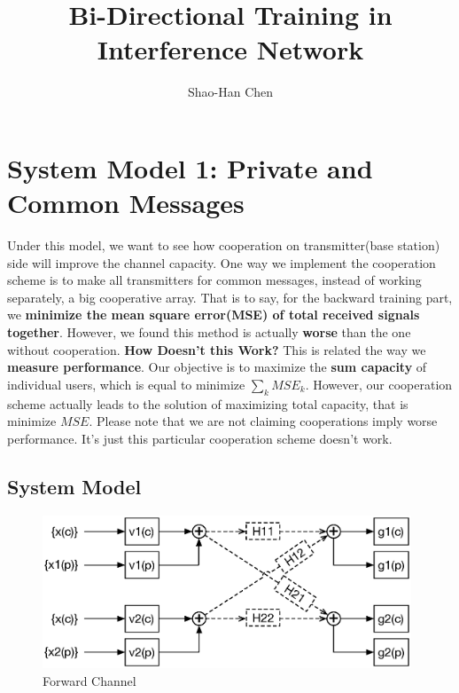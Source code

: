 \documentclass[11pt, oneside]{article}   	%
\begin{document}
\title{Bi-Directional Training in Interference Network}

\author{Shao-Han Chen}


\maketitle



\section{System Model 1: Private and Common Messages}

Under this model, we want to see how cooperation on transmitter(base station) side will improve the channel capacity. One way we implement the cooperation scheme is to make all transmitters for common messages, instead of working separately, a big cooperative array. That is to say, for the backward training part, we \textbf{minimize the mean square error(MSE) of total received signals together}. However, we found this method is actually \textbf{worse} than the one without cooperation. \textbf{How Doesn't this Work?} This is related the way we \textbf{measure performance}. Our objective is to maximize the \textbf{sum capacity} of individual users, which is equal to minimize $\displaystyle\sum_{k} MSE_{k}$. However, our cooperation scheme actually leads to the solution of maximizing total capacity, that is minimize $MSE$. Please note that we are not claiming cooperations imply worse performance. It's just this particular cooperation scheme doesn't work. 
\subsection{System Model}

\begin{figure}[h]
    \centering
    \centerline{\includegraphics[width=110mm]{forward_channel}}
    \caption{Forward Channel}
\end{figure} 
\end{document}
